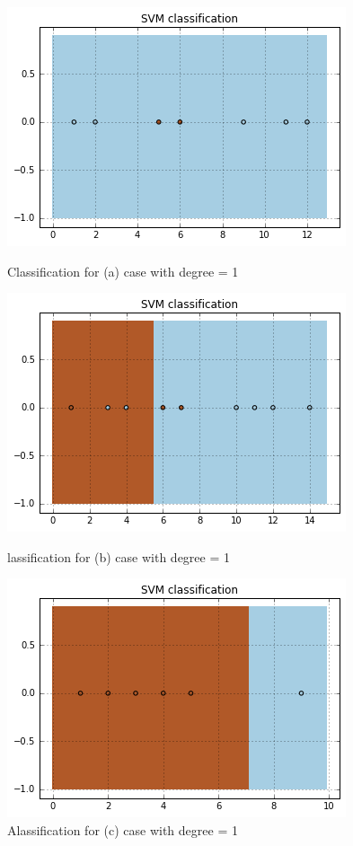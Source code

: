 \documentclass[a4paper, 12pt]{article}
\begin{document}
\begin{figure}[!htb]
  \includegraphics[width=\linewidth]{a1}
  \caption{Classification for (a) case with degree = 1}\label{fig:a1}
\endminipage\hfill
{}
  \includegraphics[width=\linewidth]{b1}
  \caption{lassification for (b) case with degree = 1}\label{fig:b1}
\endminipage\hfill
{}%
  \includegraphics[width=\linewidth]{c1}
  \caption{Alassification for (c) case with degree = 1}\label{fig:c1}
\endminipage
\end{figure}
\end{document}
